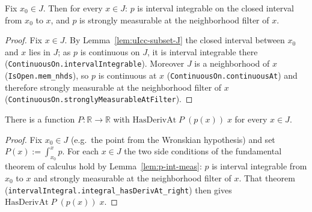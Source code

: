 \begin{lemma}
    \label{lem:p-int-meas}
    \leanok
    Fix $x_0 \in J$. Then for every $x \in J$: $p$ is interval integrable on the
    closed interval from $x_0$ to $x$, and $p$ is strongly measurable at the
    neighborhood filter of $x$.
\end{lemma}
\begin{proof}
    Fix $x \in J$. By Lemma~\ref{lem:uIcc-subset-J} the closed interval between
    $x_0$ and $x$ lies in $J$; as $p$ is continuous on $J$, it is interval
    integrable there (\texttt{ContinuousOn.intervalIntegrable}). Moreover $J$ is
    a neighborhood of $x$ (\texttt{IsOpen.mem\_nhds}), so $p$ is continuous at
    $x$ (\texttt{ContinuousOn.continuousAt}) and therefore strongly measurable at
    the neighborhood filter of $x$
    (\texttt{ContinuousOn.stronglyMeasurableAtFilter}).
\end{proof}

\begin{lemma}
    \label{lem:exists-primitive}
    \leanok
    There is a function $P : \mathbb{R} \to \mathbb{R}$ with
    $\mathrm{HasDerivAt}\;P\;(p(x))\;x$ for every $x \in J$.
\end{lemma}
\begin{proof}
    Fix $x_0 \in J$ (e.g.\ the point from the Wronskian hypothesis) and set
    $P(x) := \int_{x_0}^{x} p$. For each $x \in J$ the two side conditions of
    the fundamental theorem of calculus hold by Lemma~\ref{lem:p-int-meas}: $p$
    is interval integrable from $x_0$ to $x$ and strongly measurable at the
    neighborhood filter of $x$. That theorem
    (\texttt{intervalIntegral.integral\_hasDerivAt\_right}) then gives
    $\mathrm{HasDerivAt}\;P\;(p(x))\;x$.
\end{proof}

